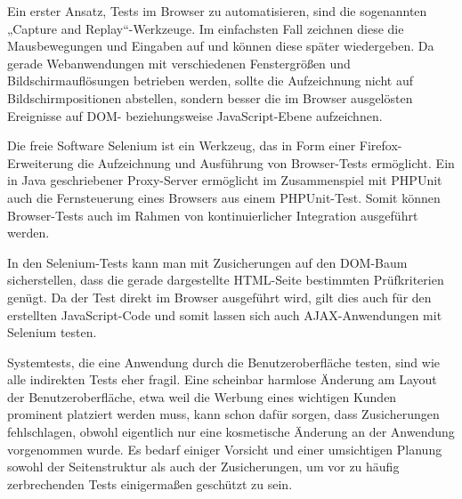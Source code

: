 Ein erster Ansatz, Tests im Browser zu automatisieren, sind die sogenannten „Capture and Replay“-Werkzeuge. Im einfachsten Fall zeichnen diese die Mausbewegungen und Eingaben auf und können diese später wiedergeben. Da gerade Webanwendungen mit verschiedenen Fenstergrößen und Bildschirmauflösungen betrieben werden, sollte die Aufzeichnung nicht auf Bildschirmpositionen abstellen, sondern besser die im Browser ausgelösten Ereignisse auf DOM- beziehungsweise JavaScript-Ebene aufzeichnen.

Die freie Software Selenium ist ein Werkzeug, das in Form einer Firefox-Erweiterung die
Aufzeichnung und Ausführung von Browser-Tests ermöglicht. Ein in Java geschriebener Proxy-Server ermöglicht im Zusammenspiel mit PHPUnit auch die Fernsteuerung eines Browsers aus einem PHPUnit-Test. Somit können Browser-Tests auch im Rahmen von kontinuierlicher Integration ausgeführt werden.

In den Selenium-Tests kann man mit Zusicherungen auf den DOM-Baum sicherstellen, dass die gerade dargestellte HTML-Seite bestimmten Prüfkriterien genügt. Da der Test direkt im Browser ausgeführt wird, gilt dies auch für den erstellten JavaScript-Code und somit lassen sich auch AJAX-Anwendungen mit Selenium testen.


Systemtests, die eine Anwendung durch die Benutzeroberfläche testen, sind wie alle indirekten Tests eher fragil. Eine scheinbar harmlose Änderung am Layout der Benutzeroberfläche, etwa weil die Werbung eines wichtigen Kunden prominent platziert werden muss, kann schon dafür sorgen, dass Zusicherungen fehlschlagen, obwohl eigentlich nur eine kosmetische Änderung an der Anwendung vorgenommen wurde. Es bedarf einiger Vorsicht und einer umsichtigen Planung sowohl der Seitenstruktur als auch der Zusicherungen, um vor zu häufig zerbrechenden Tests einigermaßen geschützt zu sein.

